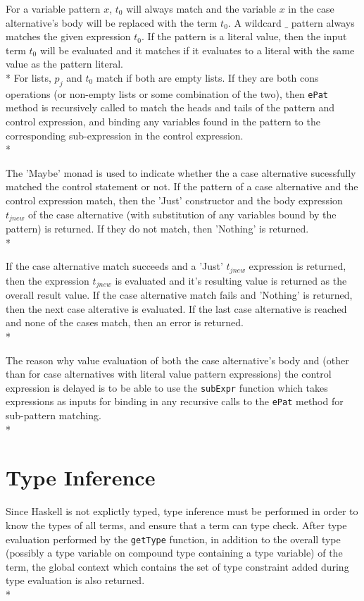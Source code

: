 \documentclass[11pt]{article}
\begin{document}
For a variable pattern $x$, $t_{0}$ will always match and the variable $x$ in the case alternative's body will be replaced with the term $t_{0}$. A wildcard $\_$ pattern always matches the given expression $t_{0}$. If the pattern is a literal value, then the input term $t_{0}$ will be evaluated and it matches if it evaluates to a literal with the same value as the pattern literal. \\*
For lists, $p_{j}$ and $t_{0}$ match if both are empty lists. If they are both cons operations (or non-empty lists or some combination of the two), then \verb|ePat| method is recursively called to match the heads and tails of the pattern and control expression, and binding any variables found in the pattern to the corresponding sub-expression in the control expression.\\* 

The 'Maybe' monad is used to indicate whether the a case alternative sucessfully matched the control statement or not. If the pattern of a case alternative and the control expression match, then the 'Just' constructor and the body expression $t_{jnew}$ of the case alternative (with substitution of any variables bound by the pattern) is returned. If they do not match, then 'Nothing' is returned. \\*

If the case alternative match succeeds and a 'Just' $t_{jnew}$ expression is returned, then the expression $t_{jnew}$ is evaluated and it's resulting value is returned as the overall result value. If the case alternative match fails and 'Nothing' is returned, then the next case alterative is evaluated. If the last case alternative is reached and none of the cases match, then an error is returned.\\*  

The reason why value evaluation of both the case alternative's body and (other than for case alternatives with literal value pattern expressions) the control expression is delayed is to be able to use the \verb|subExpr| function which takes expressions as inputs for binding in any recursive calls to the \verb|ePat| method for sub-pattern matching.\\*

\section*{Type Inference}

Since Haskell is not explictly typed, type inference must be performed in order to know the types of all terms, and ensure that a term can type check. After type evaluation performed by the \verb|getType| function, in addition to the overall type (possibly a type variable on compound type containing a type variable) of the term, the global context which contains the set of type constraint added during type evaluation is also returned.\\*
\end{document}
